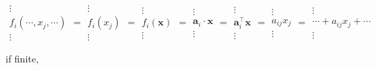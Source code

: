 \documentclass[
]{book}
\theoremstyle{definition}
\theoremstyle{definition}
\theoremstyle{definition}
\theoremstyle{definition}
\theoremstyle{remark}
\begin{document}
\[
\begin{array}{c}
\vdots\\
f_{{\scriptscriptstyle i}}\left(\cdots,x_{{\scriptscriptstyle j}},\cdots\right)\\
\vdots
\end{array}=\begin{array}{c}
\vdots\\
f_{{\scriptscriptstyle i}}\left(x_{{\scriptscriptstyle j}}\right)\\
\vdots
\end{array}=\begin{array}{c}
\vdots\\
f_{{\scriptscriptstyle i}}\left(\boldsymbol{x}\right)\\
\vdots
\end{array}=\begin{array}{c}
\vdots\\
\boldsymbol{a}_{{\scriptscriptstyle i}}\cdot\boldsymbol{x}\\
\vdots
\end{array}=\begin{array}{c}
\vdots\\
\boldsymbol{a}_{{\scriptscriptstyle i}}^{\intercal}\boldsymbol{x}\\
\vdots
\end{array}=\begin{array}{c}
\vdots\\
a_{{\scriptscriptstyle ij}}x_{{\scriptscriptstyle j}}\\
\vdots
\end{array}=\begin{array}{c}
\vdots\\
\cdots+a_{{\scriptscriptstyle ij}}x_{{\scriptscriptstyle j}}+\cdots\\
\vdots
\end{array}
\]

if finite,
\end{document}
